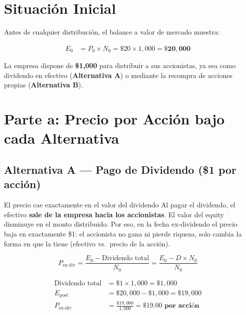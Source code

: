 \documentclass[12pt,a4paper]{article}
\begin{document}
\vspace{1cm}

\section{Situaci\'on Inicial}

Antes de cualquier distribuci\'on, el balance a valor de mercado muestra:

\begin{align}
E_0 &= P_0 \times N_0 = \$20 \times 1{,}000 = \mathbf{\$20{,}000}
\end{align}

\noindent La empresa dispone de \textbf{\$1{,}000} para distribuir a sus accionistas,
ya sea como dividendo en efectivo (\textbf{Alternativa A}) o mediante la
recompra de acciones propias (\textbf{Alternativa B}).

\vspace{1cm}

\section{Parte a: Precio por Acci\'on bajo cada Alternativa}

\subsection*{Alternativa A --- Pago de Dividendo (\$1 por acci\'on)}

\begin{cajaintuicion}{El precio cae exactamente en el valor del dividendo}
Al pagar el dividendo, el efectivo \textbf{sale de la empresa hacia los accionistas}.
El valor del equity disminuye en el monto distribuido. Por eso, en la fecha
ex-dividendo el precio baja en exactamente \$1: el accionista no gana ni pierde
riqueza, solo cambia la forma en que la tiene (efectivo vs.\ precio de la acci\'on).
\end{cajaintuicion}

\begin{cajaformula}
\[
P_{\text{ex-div}} = \frac{E_0 - \text{Dividendo total}}{N_0}
= \frac{E_0 - D \times N_0}{N_0}
\]
\end{cajaformula}

\begin{align}
\text{Dividendo total} &= \$1 \times 1{,}000 = \$1{,}000 \\[6pt]
E_{\text{post}} &= \$20{,}000 - \$1{,}000 = \$19{,}000 \\[6pt]
P_{\text{ex-div}} &= \frac{\$19{,}000}{1{,}000}
= \mathbf{\$19.00 \text{ por acci\'on}}
\end{align}
\end{document}
